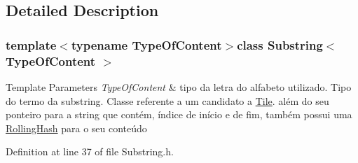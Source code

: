 \subsection{Detailed Description}
\subsubsection*{template$<$typename Type\+Of\+Content$>$class Substring$<$ Type\+Of\+Content $>$}


\begin{DoxyTemplParams}{Template Parameters}
{\em Type\+Of\+Content} & tipo da letra do alfabeto utilizado. Tipo do termo da substring. Classe referente a um candidato a \hyperlink{classTile}{Tile}. além do seu ponteiro para a string que contém, índice de início e de fim, também possui uma \hyperlink{classRollingHash}{Rolling\+Hash} para o seu conteúdo \\
\hline
\end{DoxyTemplParams}


Definition at line 37 of file Substring.\+h.



